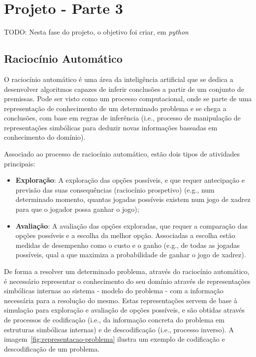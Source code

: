 \chapter{Projeto - Parte 3}\label{ch:projeto-parte3}

TODO: Nesta fase do projeto, o objetivo foi criar, em \textit{python}


\section{Raciocínio Automático}\label{sec:raciocinio-automatico}

O raciocínio automático é uma área da inteligência artificial que se dedica a desenvolver algoritmos capazes de inferir conclusões a partir de um conjunto de premissas.
Pode ser visto como um processo computacional, onde se parte de uma representação de conhecimento de um determinado problema e se chega a conclusões, com base em regras de inferência (i.e., processo de manipulação de representações simbólicas para deduzir novas informações baseadas em conhecimento do domínio).

Associado ao processo de raciocínio automático, estão dois tipos de atividades principais:

\begin{itemize}
    \item \textbf{Exploração}: A exploração das opções possíveis, e que requer antecipação e previsão das suas consequências (raciocínio prospetivo) (e.g., num determinado momento, quantas jogadas possíveis existem num jogo de xadrez para que o jogador possa ganhar o jogo);
    \item \textbf{Avaliação}: A avaliação das opções exploradas, que requer a comparação das opções possíveis e a escolha da melhor opção.
    Associadas a escolha estão medidas de desempenho como o custo e o ganho (e.g., de todas as jogadas possíveis, qual a que maximiza a probabilidade de ganhar o jogo de xadrez).
\end{itemize}

De forma a resolver um determinado problema, através do raciocínio automático, é necessário representar o conhecimento do seu domínio através de representações simbólicas internas ao sistema - modelo do problema - com a informação necessária para a resolução do mesmo.
Estas representações servem de base à simulação para exploração e avaliação de opções possíveis, e são obtidas através de processos de codificação (i.e., da informação concreta do problema em estruturas simbólicas internas) e de descodificação (i.e., processo inverso).
A imagem~\ref{fig:representacao-problema} ilustra um exemplo de codificação e descodificação de um problema.

